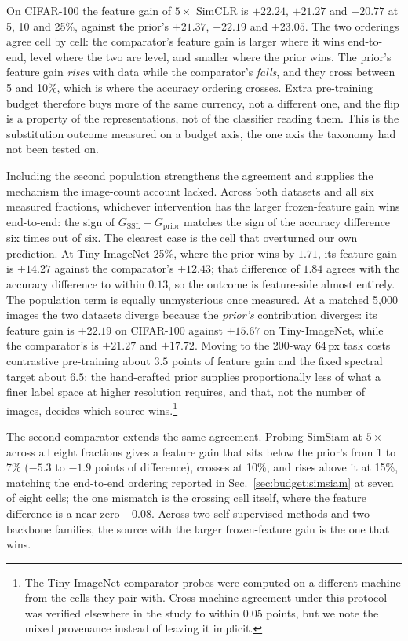 On CIFAR-100 the feature gain of $5\times$ SimCLR is $+22.24$, $+21.27$ and
$+20.77$ at 5, 10 and 25\%, against the prior's $+21.37$, $+22.19$ and
$+23.05$. The two orderings agree cell by cell: the comparator's feature gain
is larger where it wins end-to-end, level where the two are level, and smaller
where the prior wins. The prior's feature gain \emph{rises} with data while the
comparator's \emph{falls}, and they cross between 5 and 10\%, which is where
the accuracy ordering crosses. Extra pre-training budget therefore buys more of
the same currency, not a different one, and the flip is a property of the
representations, not of the classifier reading them. This is the substitution
outcome measured on a budget axis, the one axis the taxonomy had not been
tested on.

 Including the second population strengthens the agreement and supplies the
mechanism the image-count account lacked. Across both datasets and all six
measured fractions, whichever intervention has the larger frozen-feature gain
wins end-to-end: the sign of $G_{\mathrm{SSL}} - G_{\mathrm{prior}}$ matches
the sign of the accuracy difference six times out of six. The clearest case is
the cell that overturned our own prediction. At Tiny-ImageNet 25\%, where the
prior wins by $1.71$, its feature gain is $+14.27$ against the comparator's
$+12.43$; that difference of $1.84$ agrees with the accuracy difference to
within $0.13$, so the outcome is feature-side almost entirely. The population
term is equally unmysterious once measured. At a matched 5{,}000 images the two
datasets diverge because the \emph{prior's} contribution diverges: its feature
gain is $+22.19$ on CIFAR-100 against $+15.67$ on Tiny-ImageNet, while the
comparator's is $+21.27$ and $+17.72$. Moving to the 200-way $64$\,px task
costs contrastive pre-training about $3.5$ points of feature gain and the fixed
spectral target about $6.5$: the hand-crafted prior supplies proportionally
less of what a finer label space at higher resolution requires, and that,
not the number of images, decides which source wins.\footnote{The
Tiny-ImageNet comparator probes were computed on a different machine from the
cells they pair with. Cross-machine agreement under this protocol was verified
elsewhere in the study to within $0.05$ points, but we note the mixed
provenance instead of leaving it implicit.}

The second comparator extends the same agreement. Probing SimSiam at $5\times$
across all eight fractions gives a feature gain that sits below the prior's
from 1 to 7\% ($-5.3$ to $-1.9$ points of difference), crosses at 10\%, and
rises above it at 15\%, matching the end-to-end ordering reported in
Sec.~\ref{sec:budget:simsiam} at seven of eight cells; the one mismatch is
the crossing cell itself, where the feature difference is a near-zero $-0.08$. Across two
self-supervised methods and two backbone families, the source with the larger
frozen-feature gain is the one that wins.

